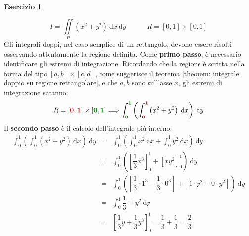 \documentclass[a4paper]{article}
\newcommand{\example}[1]{\textcolor{Green4}{\textbf{#1}}}
\begin{document}
	\begin{flushleft}
		\example{\underline{Esercizio 1}}
	\end{flushleft}
	\begin{equation*}
		I = \displaystyle\iint \limits_{R} \left(x^{2}+y^{2}\right) \:\mathrm{d}x \:\mathrm{d}y \hspace{3em} R = \left[0,1\right] \times \left[0,1\right]
	\end{equation*}
	Gli integrali doppi, nel caso semplice di un rettangolo, devono essere risolti osservando attentamente la regione definita. Come \textbf{primo passo}, è necessario identificare gli estremi di integrazione. Ricordando che la regione è scritta nella forma del tipo $\left[a,b\right] \times \left[c,d\right]$, come suggerisce il teorema \ref{theorem: integrale doppio su regione rettangolare}, e che $a,b$ sono sull'asse $x$, gli estremi di integrazione saranno:
	\begin{equation*}
		R = \left[\textcolor{Red3}{\mathbf{0}},\textcolor{Red3}{\mathbf{1}}\right] \times \left[\textcolor{Green4}{\mathbf{0}},\textcolor{Green4}{\mathbf{1}}\right] 
		\Longrightarrow 
		\displaystyle \int_{\textcolor{Green4}{\mathbf{0}}}^{\textcolor{Green4}{\mathbf{1}}} \left(\int_{\textcolor{Red3}{\mathbf{0}}}^{\textcolor{Red3}{\mathbf{1}}} \left(x^{2}+y^{2}\right) \:\mathrm{d}x\right) \:\mathrm{d}y
	\end{equation*}
	Il \textbf{secondo passo} è il calcolo dell'integrale più interno:
	\begin{equation*}
		\begin{array}{rcl}
			\displaystyle \int_{0}^{1} \left(\int_{0}^{1} \left(x^{2}+y^{2}\right) \:\mathrm{d}x\right) \:\mathrm{d}y 
			&=& 
			\displaystyle \int_{0}^{1} \left(\int_{0}^{1} x^{2} \:\mathrm{d}x + \int_{0}^{1} y^{2} \:\mathrm{d}x\right) \:\mathrm{d}y \\ [1.5em]
			&=&
			\displaystyle \int_{0}^{1} \left(\left[\dfrac{1}{3}x^{3}\right]_{0}^{1} + \left[xy^{2}\right]_{0}^{1}\right) \:\mathrm{d}y \\ [1.5em]
			&=&
			\displaystyle \int_{0}^{1} \left(\left[\dfrac{1}{3} \cdot 1^{3} - \dfrac{1}{3} \cdot 0^{3}\right] + \left[1 \cdot y^{2} - 0 \cdot y^{2}\right]\right) \:\mathrm{d}y \\ [1.5em]
			&=& \displaystyle \int_{0}^{1} \dfrac{1}{3} + y^{2} \: \mathrm{d}y \\ [1em]
			&=& \left[\dfrac{1}{3}y + \dfrac{1}{3}y^{3}\right]_{0}^{1} = \dfrac{1}{3} + \dfrac{1}{3} = \dfrac{2}{3}
		\end{array}
	\end{equation*}\newpage
	
\end{document}
